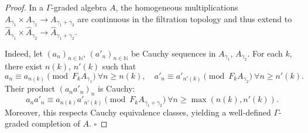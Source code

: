 \documentclass[10pt,a4paper]{amsart}
\begin{document}
\noindent\begin{proof}
In a $\Gamma$-graded algebra $A$, the homogeneous multiplications $A_{\gamma_1}\times A_{\gamma_2}\to A_{\gamma_1+\gamma_2}$ are continuous in the filtration topology and thus extend to $\widehat{A}_{\gamma_1}\times\widehat{A}_{\gamma_2}\to\widehat{A}_{\gamma_1+\gamma_2}$.

\noindent
Indeed, let $(a_n)_{n\in\mathbb{N}}$, $(a'_n)_{n\in\mathbb{N}}$ be Cauchy sequences in $A_{\gamma_1}$, $A_{\gamma_2}$. For each $k$, there exist $n(k)$, $n'(k)$ such that
\[
a_n\equiv a_{n(k)}\pmod{F_kA_{\gamma_1}}\ \forall n\ge n(k), \quad a'_n\equiv a'_{n'(k)}\pmod{F_kA_{\gamma_2}}\ \forall n\ge n'(k).
\]
Their product $(a_na'_n)_n$ is Cauchy:
\[
a_na'_n\equiv a_{n(k)}a'_{n'(k)}\pmod{F_kA_{\gamma_1+\gamma_2}}\ \forall n\ge\max(n(k),n'(k)).
\]
Moreover, this respects Cauchy equivalence classes, yielding a well-defined $\Gamma$-graded completion of $A$.  $\square$
\end{proof}
\end{document}
